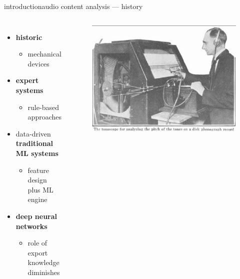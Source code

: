         \begin{frame}{introduction}{audio content analysis --- history}
            \begin{columns}
            \begin{itemize}
                \item<1->   \textbf{historic}
                    \begin{itemize}
                        \item   mechanical devices
                    \end{itemize}
                \smallskip
                \item<2->   \textbf{expert systems}
                            \begin{itemize}
                                \item   rule-based approaches
                            \end{itemize}
                \smallskip
                \item<3->   data-driven \textbf{traditional ML systems }
                    \begin{itemize}
                        \item   feature design plus ML engine
                    \end{itemize}
                \smallskip
                \item<4->   \textbf{deep neural networks}
                    \begin{itemize}
                        \item   role of export knowledge diminishes
                    \end{itemize}
            \end{itemize}
                \begin{figure}
                    \includegraphics[width=\columnwidth]{graph/tonoscope}
                \end{figure}
            \end{columns}
        \end{frame}
        
